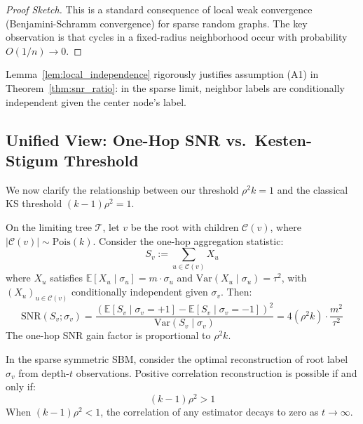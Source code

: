 \begin{proof}[Proof Sketch]
This is a standard consequence of local weak convergence (Benjamini-Schramm convergence) for sparse random graphs. The key observation is that cycles in a fixed-radius neighborhood occur with probability $O(1/n) \to 0$.
\end{proof}

\begin{remark}
Lemma~\ref{lem:local_independence} rigorously justifies assumption (A1) in Theorem~\ref{thm:snr_ratio}: in the sparse limit, neighbor labels are conditionally independent given the center node's label.
\end{remark}

\subsection{Unified View: One-Hop SNR vs.\ Kesten-Stigum Threshold}
\label{subsec:unified_ks}

We now clarify the relationship between our threshold $\rho^2 k = 1$ and the classical KS threshold $(k-1)\rho^2 = 1$.

\begin{proposition}
\label{prop:one_step_snr}
On the limiting tree $\mathcal{T}$, let $v$ be the root with children $\mathcal{C}(v)$, where $|\mathcal{C}(v)| \sim \mathrm{Pois}(k)$. Consider the one-hop aggregation statistic:
\begin{equation}
    S_v := \sum_{u \in \mathcal{C}(v)} X_u
\end{equation}
where $X_u$ satisfies $\mathbb{E}[X_u \mid \sigma_u] = m \cdot \sigma_u$ and $\mathrm{Var}(X_u \mid \sigma_u) = \tau^2$, with $(X_u)_{u \in \mathcal{C}(v)}$ conditionally independent given $\sigma_v$. Then:
\begin{equation}
    \mathrm{SNR}(S_v; \sigma_v) = \frac{(\mathbb{E}[S_v \mid \sigma_v = +1] - \mathbb{E}[S_v \mid \sigma_v = -1])^2}{\mathrm{Var}(S_v \mid \sigma_v)} = 4(\rho^2 k) \cdot \frac{m^2}{\tau^2}
\end{equation}
The one-hop SNR gain factor is proportional to $\rho^2 k$.
\end{proposition}

\begin{theorem}
\label{thm:ks_nonbacktrack}
In the sparse symmetric SBM, consider the optimal reconstruction of root label $\sigma_v$ from depth-$t$ observations. Positive correlation reconstruction is possible if and only if:
\begin{equation}
    (k-1)\rho^2 > 1
\end{equation}
When $(k-1)\rho^2 < 1$, the correlation of any estimator decays to zero as $t \to \infty$.
\end{theorem}

